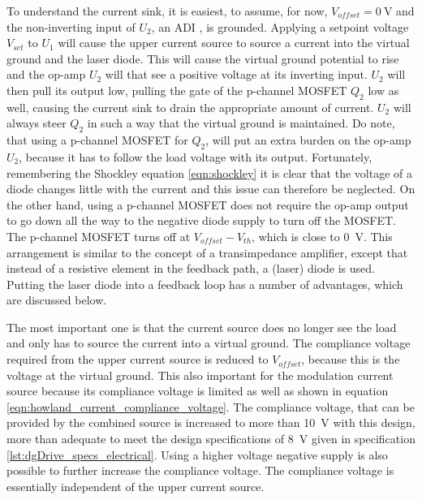 To understand the current sink, it is easiest, to assume, for now, $V_{offset} = \qty{0}{\V}$ and the non-inverting input of $U_2$, an ADI , is grounded. Applying a setpoint voltage $V_{set}$ to $U_1$ will cause the upper current source to source a current into the virtual ground and the laser diode. This will cause the virtual ground potential to rise and the op-amp $U_2$ will that see a positive voltage at its inverting input. $U_2$ will then pull its output low, pulling the gate of the p-channel MOSFET $Q_2$ low as well, causing the current sink to drain the appropriate amount of current. $U_2$ will always steer $Q_2$ in such a way that the virtual ground is maintained. Do note, that using a p-channel MOSFET for $Q_2$, will put an extra burden on the op-amp $U_2$, because it has to follow the load voltage with its output. Fortunately, remembering the Shockley equation \ref{eqn:shockley} it is clear that the voltage of a diode changes little with the current and this issue can therefore be neglected. On the other hand, using a p-channel MOSFET does not require the op-amp output to go down all the way to the negative diode supply to turn off the MOSFET. The p-channel MOSFET turns off at $V_{offset}-V_{th}$, which is close to \qty{0}{\V}. This arrangement is similar to the concept of a transimpedance amplifier, except that instead of a resistive element in the feedback path, a (laser) diode is used. Putting the laser diode into a feedback loop has a number of advantages, which are discussed below.

The most important one is that the current source does no longer see the load and only has to source the current into a virtual ground. The compliance voltage required from the upper current source is reduced to $V_{offset}$, because this is the voltage at the virtual ground. This also important for the modulation current source because its compliance voltage is limited as well as shown in equation \ref{eqn:howland_current_compliance_voltage}. The compliance voltage, that can be provided by the combined source is increased to more than \qty{10}{\V} with this design, more than adequate to meet the design specifications of \qty{8}{\V} given in specification \ref{lst:dgDrive_specs_electrical}. Using a higher voltage negative supply is also possible to further increase the compliance voltage. The compliance voltage is essentially independent of the upper current source.

